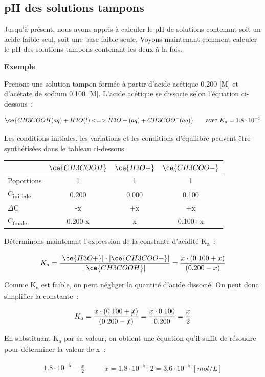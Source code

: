 \documentclass[
  11pt,
  a4paper,
  openany]{book}
\begin{document}
\subsection{pH des solutions tampons}\label{ph-des-solutions-tampons}

Jusqu'à présent, nous avons appris à calculer le pH de solutions contenant soit un acide faible seul, soit une base faible seule. Voyons maintenant comment calculer le pH des solutions tampons contenant les deux à la fois.

\textbf{Exemple}

Prenons une solution tampon formée à partir d'acide acétique 0.200 {[}M{]} et d'acétate de sodium 0.100 {[}M{]}. L'acide acétique se dissocie selon l'équation ci-dessous~:

\[
\ce{CH3COOH(aq) + H2O(l) <=> H3O+(aq) + CH3COO^{-}(aq)} \qquad \text{avec } K_a = 1.8 \cdot 10^{-5}
\]

Les conditions initiales, les variations et les conditions d'équilibre peuvent être synthétisées dans le tableau ci-dessous.

\begin{longtable}[]{@{}lccc@{}}
\toprule\noalign{}
& \(\ce{ CH3COOH}\) & \(\ce{H3O+}\) & \(\ce{CH3COO-}\) \\
\midrule\noalign{}
\endhead
\bottomrule\noalign{}
\endlastfoot
Poportions & 1 & 1 & 1 \\
C\textsubscript{initiale} & 0.200 & 0.000 & 0.100 \\
\(\Delta\)C & -x & +x & +x \\
C\textsubscript{finale} & 0.200-x & x & 0.100+x \\
\end{longtable}

Déterminons maintenant l'expression de la constante d'acidité K\textsubscript{a}~:

\[
K_a = \frac{|\ce{H3O+}| \cdot |\ce{CH3COO-}|}{|\ce{CH3COOH}|} =  \frac{x \cdot (0.100 + x)}{(0.200 - x)}
\]

Comme K\textsubscript{a} est faible, on peut négliger la quantité d'acide dissocié. On peut donc simplifier la constante~:

\[
K_a =  \frac{x \cdot (0.100 + \cancel{x})}{(0.200 - \cancel{x})} = \frac{x \cdot 0.100}{0.200} = \frac{x}{2}
\]

En substituant K\textsubscript{a} par sa valeur, on obtient une équation qu'il suffit de résoudre pour déterminer la valeur de x~:

\[
\begin{split}
1.8 \cdot 10^{-5} = \frac{x}{2}
\end{split}
\qquad
\begin{split}
x = 1.8 \cdot 10^{-5} \cdot 2 = 3.6 \cdot 10^{-5}\ [mol/L]
\end{split}
\]
\end{document}

